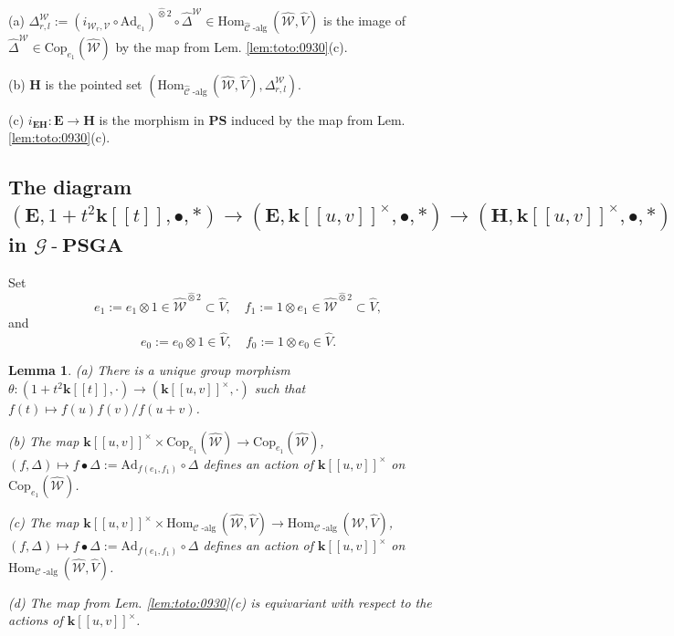 \documentclass[10pt]{amsart}
\newtheorem{lem}[thm]{Lemma}
\numberwithin{equation}{subsection}
\begin{document}
\begin{defn}\label{defn:2:7:korea}
(a)    $\Delta^{\mathcal W}_{r,l}:=(i_{\mathcal W_r,\mathcal V}\circ
    \mathrm{Ad}_{e_1})^{\hat\otimes 2}\circ\hat\Delta^{\mathcal W}\in
\mathrm{Hom}_{\hat{\mathcal C}\operatorname{-alg}}(\hat{\mathcal W},
\hat V)$ is the image of $\hat\Delta^{\mathcal W}\in\mathrm{Cop}_{e_1}(\hat{\mathcal W})$ 
by the map from Lem. \ref{lem:toto:0930}(c). 

(b) $\mathbf H$ is the pointed set 
$(\mathrm{Hom}_{\hat{\mathcal C}\operatorname{-alg}}(\hat{\mathcal W},
\hat V),\Delta^{\mathcal W}_{r,l})$. 

(c) $i_{\mathbf E\mathbf H} : \mathbf E\to\mathbf H$ is the morphism in $\mathbf{PS}$
induced by the map from Lem. \ref{lem:toto:0930}(c). 
\end{defn}

\subsection{The diagram $(\mathbf E,1+t^2\mathbf k[[t]],\bullet,*)\to(\mathbf E,\mathbf k[[u,v]]^\times,\bullet,*)\to
(\mathbf H,\mathbf k[[u,v]]^\times,\bullet,*)$ in $\mathcal G\operatorname{-}\mathbf{PSGA}$}\label{sect:2:3:5786}

Set 
$$
e_1:=e_1\otimes1\in\hat{\mathcal W}^{\hat\otimes2}\subset \hat V,\quad f_1:=1\otimes e_1\in\hat{\mathcal W}^{\hat\otimes2}\subset \hat V, 
$$
and 
$$
e_0:=e_0\otimes1\in\hat V,\quad f_0:=1\otimes e_0\in\hat V.  
$$

\begin{lem}\label{lem28:1001}
(a) There is a unique group morphism $\theta : (1+t^2\mathbf k[[t]],\cdot)\to
(\mathbf k[[u,v]]^\times,\cdot)$ such that $f(t)\mapsto f(u)f(v)/f(u+v)$.    

(b) The map $\mathbf k[[u,v]]^\times\times \mathrm{Cop}_{e_1}(\hat{\mathcal W})
\to \mathrm{Cop}_{e_1}(\hat{\mathcal W})$, $(f,\Delta)\mapsto 
f\bullet \Delta:=\mathrm{Ad}_{f(e_1,f_1)}\circ\Delta$ defines an action of 
$\mathbf k[[u,v]]^\times$ on $\mathrm{Cop}_{e_1}(\hat{\mathcal W})$. 


(c) The map $\mathbf k[[u,v]]^\times\times 
\mathrm{Hom}_{\mathcal C\operatorname{-alg}}(\hat{\mathcal W},\hat V)
\to \mathrm{Hom}_{\mathcal C\operatorname{-alg}}(\hat{\mathcal W},\hat V)$, 
$(f,\Delta)\mapsto f\bullet \Delta:=
\mathrm{Ad}_{f(e_1,f_1)}\circ\Delta$ defines an action of 
$\mathbf k[[u,v]]^\times$ on 
$\mathrm{Hom}_{\mathcal C\operatorname{-alg}}(\hat{\mathcal W},\hat V)$. 

(d) The map from Lem. \ref{lem:toto:0930}(c) is equivariant with respect to the actions of $\mathbf k[[u,v]]^\times$.  
\end{lem}
    
\end{document}
